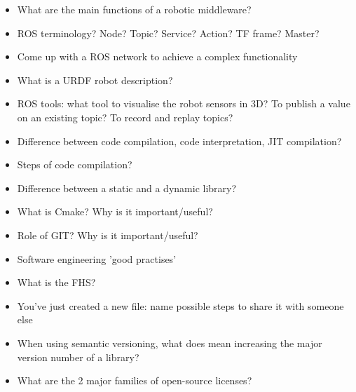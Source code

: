 \documentclass[compress]{beamer}
\begin{document}
\begin{frame}[plain]
    \begin{center}
        \begin{itemize}
        \item {What are the main functions of a robotic middleware?}
        \item {ROS terminology? Node? Topic? Service? Action? TF frame? Master?}
        \item {Come up with a ROS network to achieve a complex functionality}
        \item {What is a URDF robot description?}
        \item {ROS tools: what tool to visualise the robot sensors in 3D? To publish a value on an existing topic? To record and replay topics?}
        \end{itemize}
    \end{center}
\end{frame}

\begin{frame}[plain]
    \begin{center}
        \begin{itemize}
        \item {Difference between code compilation, code interpretation, JIT compilation?}
        \item {Steps of code compilation?}
        \item {Difference between a static and a dynamic library?}
        \item {What is Cmake? Why is it important/useful?}
        \item {Role of GIT? Why is it important/useful?}
        \item {Software engineering 'good practises'}
        \item {What is the FHS?}
        \item {You’ve just created a new file: name possible steps to share it with someone else}
        \item {When using semantic versioning, what does mean increasing the major version number of a library?}
        \item {What are the 2 major families of open-source licenses?}
        \end{itemize}
    \end{center}
\end{frame}
\end{document}
